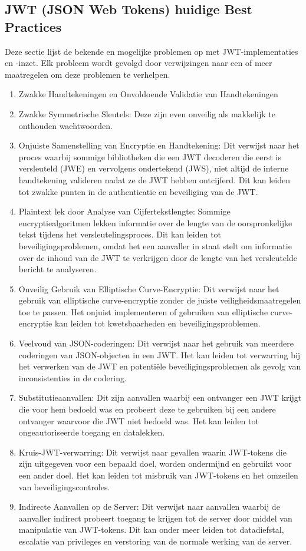   \subsection{JWT (JSON Web Tokens) huidige Best Practices}%
  \label{subsec:jwt-huidige-best-practices}
  Deze sectie lijst de bekende en mogelijke problemen op met JWT-implementaties en -inzet. Elk probleem wordt gevolgd door verwijzingen naar een of meer maatregelen om deze problemen te verhelpen.
  \begin{enumerate}[label=\textbf{-}]
      \item Zwakke Handtekeningen en Onvoldoende Validatie van Handtekeningen
      \item Zwakke Symmetrische Sleutels: Deze zijn even onveilig als makkelijk te onthouden wachtwoorden.
      \item Onjuiste Samenstelling van Encryptie en Handtekening: Dit verwijst naar het proces waarbij sommige bibliotheken die een JWT decoderen die eerst is versleuteld (JWE) en vervolgens ondertekend (JWS), niet altijd de interne handtekening valideren nadat ze de JWT hebben ontcijferd. Dit kan leiden tot zwakke punten in de authenticatie en beveiliging van de JWT.
      \item Plaintext lek door Analyse van Cijfertekstlengte: Sommige encryptiealgoritmen lekken informatie over de lengte van de oorspronkelijke tekst tijdens het versleutelingsproces. Dit kan leiden tot beveiligingsproblemen, omdat het een aanvaller in staat stelt om informatie over de inhoud van de JWT te verkrijgen door de lengte van het versleutelde bericht te analyseren.
      \item Onveilig Gebruik van Elliptische Curve-Encryptie: Dit verwijst naar het gebruik van elliptische curve-encryptie zonder de juiste veiligheidsmaatregelen toe te passen. Het onjuist implementeren of gebruiken van elliptische curve-encryptie kan leiden tot kwetsbaarheden en beveiligingsproblemen.
      \item Veelvoud van JSON-coderingen: Dit verwijst naar het gebruik van meerdere coderingen van JSON-objecten in een JWT. Het kan leiden tot verwarring bij het verwerken van de JWT en potentiële beveiligingsproblemen als gevolg van inconsistenties in de codering.
      \item Substitutieaanvallen: Dit zijn aanvallen waarbij een ontvanger een JWT krijgt die voor hem bedoeld was en probeert deze te gebruiken bij een andere ontvanger waarvoor die JWT niet bedoeld was. Het kan leiden tot ongeautoriseerde toegang en datalekken.
      \item Kruis-JWT-verwarring: Dit verwijst naar gevallen waarin JWT-tokens die zijn uitgegeven voor een bepaald doel, worden ondermijnd en gebruikt voor een ander doel. Het kan leiden tot misbruik van JWT-tokens en het omzeilen van beveiligingscontroles.
      \item Indirecte Aanvallen op de Server: Dit verwijst naar aanvallen waarbij de aanvaller indirect probeert toegang te krijgen tot de server door middel van manipulatie van JWT-tokens. Dit kan onder meer leiden tot datadiefstal, escalatie van privileges en verstoring van de normale werking van de server.
  \end{enumerate}
